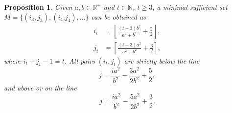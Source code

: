 \documentclass[12pt, a4paper]{article}
\newcommand{\tiles}{t} %
\newcommand{\mss}{M}
\newtheorem{proposition}{Proposition}%
\begin{document}
\begin{proposition}
\label{prop: min suff set, form}
Given $a, b \in \mathbb R^+$ and $\tiles \in \mathbb N$, $\tiles \geq 3$, a minimal sufficient set $\mss = \{(i_3,j_3), (i_4.j_4), \ldots\}$ can be obtained as
\begin{align}
\label{eq: min suff set, form, i}
i_\tiles &= \left\lfloor \frac{(\tiles-3) b^2}{a^2+b^2} + \frac 5 2 \right\rfloor, \\
\label{eq: min suff set, form, j}
j_\tiles &= \left\lceil  \frac{(\tiles-3) a^2}{a^2+b^2} + \frac 3 2 \right\rceil,
\end{align}
where $i_\tiles + j_\tiles-1 = \tiles$. All pairs $(i_\tiles,j_\tiles)$ are strictly below the line
\begin{equation}
\label{eq: upper bound, line}
j = \frac{i a^2}{b^2} - \frac{3a^2}{2b^2} + \frac 5 2,
\end{equation}
and above or on the line
\begin{equation}
\label{eq: lower bound, line}
j = \frac{i a^2}{b^2} - \frac{5a^2}{2b^2} + \frac 3 2.
\end{equation}
\end{proposition}
\end{document}
